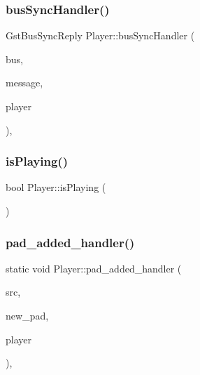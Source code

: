 \mbox{\label{class_player_a987a5a6f6bf24f530536090e9a832ef6}} 
\subsubsection{\texorpdfstring{bus\+Sync\+Handler()}{busSyncHandler()}\hspace{0.1cm}{\footnotesize\ttfamily [2/2]}}
{\footnotesize\ttfamily Gst\+Bus\+Sync\+Reply Player\+::bus\+Sync\+Handler (\begin{DoxyParamCaption}\item[{Gst\+Bus $\ast$}]{bus,  }\item[{Gst\+Message $\ast$}]{message,  }\item[{\hyperlink{class_player}{Player} $\ast$}]{player }\end{DoxyParamCaption})\hspace{0.3cm}{\ttfamily [static]}, {\ttfamily [private]}}

\mbox{\label{class_player_a370339dfdf9eb61905637283a72f9e22}} 
\subsubsection{\texorpdfstring{is\+Playing()}{isPlaying()}}
{\footnotesize\ttfamily bool Player\+::is\+Playing (\begin{DoxyParamCaption}{ }\end{DoxyParamCaption})\hspace{0.3cm}{\ttfamily [inline]}}

\mbox{\label{class_player_a3e74802e5bf9b62f5a0908637ace1913}} 
\subsubsection{\texorpdfstring{pad\+\_\+added\+\_\+handler()}{pad\_added\_handler()}\hspace{0.1cm}{\footnotesize\ttfamily [1/2]}}
{\footnotesize\ttfamily static void Player\+::pad\+\_\+added\+\_\+handler (\begin{DoxyParamCaption}\item[{Gst\+Element $\ast$}]{src,  }\item[{Gst\+Pad $\ast$}]{new\+\_\+pad,  }\item[{\hyperlink{class_player}{Player} $\ast$}]{player }\end{DoxyParamCaption})\hspace{0.3cm}{\ttfamily [static]}, {\ttfamily [private]}}

